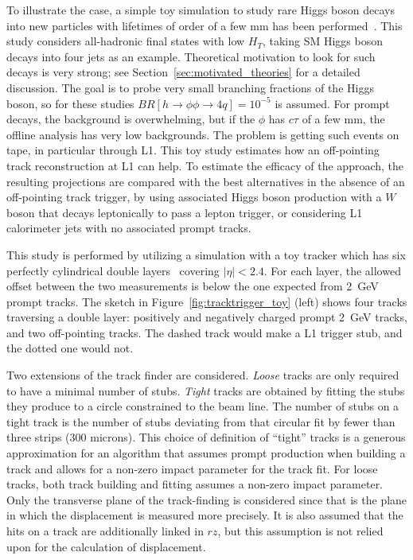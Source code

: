 To illustrate the case, a simple toy simulation to study rare Higgs boson decays into new particles with lifetimes of order of a few mm has been performed~\cite{Gershtein:2017tsv}. This study considers all-hadronic final states with low $H_T$, taking SM Higgs boson decays into four jets as an example. Theoretical motivation to look for such decays is very strong; see Section~\ref{sec:motivated_theories} for a detailed discussion. The goal is to probe very small branching fractions of the Higgs boson, so for these studies $BR[h\rightarrow\phi\phi\rightarrow 4q] = 10^{-5}$ is assumed. For prompt decays, the background is overwhelming, but if the $\phi$ has $c\tau$ of a few mm, the offline analysis has very low backgrounds. The problem is getting such events on tape, in particular through L1. This toy study estimates how an off-pointing track reconstruction at L1 can help. To estimate the efficacy of the approach, the resulting projections are compared with the best alternatives in the absence of an off-pointing track trigger, by using associated Higgs boson production with a $W$ boson that decays leptonically to pass a lepton trigger, or considering L1 calorimeter jets with no associated prompt tracks.

This study is performed by utilizing a simulation with a toy tracker which has six perfectly cylindrical double layers~\cite{geom} %
covering $|\eta|<2.4$. For each layer, the allowed offset between the two measurements is below the one expected from 2~GeV prompt tracks. The sketch in Figure~\ref{fig:tracktrigger_toy} (left) shows four tracks traversing a double layer: positively and negatively charged
prompt 2~GeV tracks, and two off-pointing tracks. The dashed track would make a L1 trigger stub, and the dotted one would not.

Two extensions of the track finder are considered. {\it Loose} tracks are only required to have a minimal number of stubs. {\it Tight} tracks are obtained by fitting the stubs they produce to a circle constrained to the beam line. The number of stubs on a tight track is the number of stubs deviating from that circular fit by fewer than three strips (300 microns). This choice of definition of ``tight'' tracks is a generous approximation for an algorithm that assumes prompt production when building a track and allows for a non-zero impact parameter for the track fit. For loose tracks, both track building and fitting assumes a non-zero impact parameter. Only the transverse plane of the track-finding is considered since that is the plane in which the displacement is measured more precisely. It is also assumed that the hits on a track are additionally linked in $rz$, but this assumption is not relied upon for the calculation of displacement.

